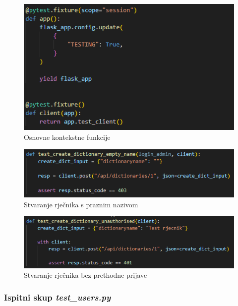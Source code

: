 \begin{figure}[htp]
	\includegraphics[scale=0.9]{slike/fixture_root.png}
	\centering
	\caption{Osnovne kontekstne funkcije}
	\label{fig:test-2}
\end{figure}

\begin{figure}[htp]
	\includegraphics[scale=1]{slike/test_dict_1.png}
	\centering
	\caption{Stvaranje rječnika s praznim nazivom}
	\label{fig:test-3}
\end{figure}

\begin{figure}[htp]
	\includegraphics[scale=0.95]{slike/test_dict_2.png}
	\centering
	\caption{Stvaranje rječnika bez prethodne prijave}
	\label{fig:test-4}
\end{figure}

\eject

\subsubsection{Ispitni skup \emph{test\_users.py}}

